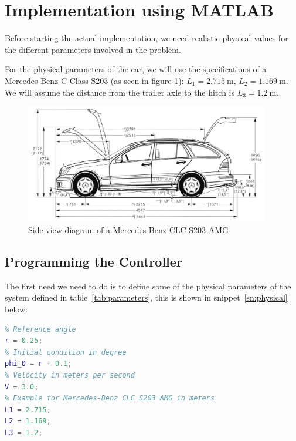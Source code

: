 \section{Implementation using MATLAB}
Before starting the actual implementation, we need realistic physical values for the different parameters involved in the problem.

For the physical parameters of the car, we will use the specifications of a Mercedes-Benz C-Class S203 (as seen in figure \ref{fig:car-sideview}): $L_{1} = \SI{2.715}{\m}$, $L_{2} = \SI{1.169}{\m}$. We will assume the distance from the trailer axle to the hitch is $L_{3} = \SI{1.2}{\m}$.

\begin{figure}[H]
	\centering
	\includegraphics[width=0.95\textwidth]{images/S203_Seitenansicht}
	\caption{Side view diagram of a Mercedes-Benz CLC S203 AMG}
	\label{fig:car-sideview}
\end{figure}

\subsection{Programming the Controller}
The first need we need to do is to define some of the physical parameters of the system defined in table~\ref{tab:parameters}, this is shown in snippet~\ref{sn:physical} below:
\begin{lstlisting}[language=matlab, label=sn:physical, caption=Physical parameters for the model]
%% Parameters
% Reference angle
r = 0.25;
% Initial condition in degree
phi_0 = r + 0.1;
% Velocity in meters per second
V = 3.0;
% Example for Mercedes-Benz CLC S203 AMG in meters
L1 = 2.715;
L2 = 1.169;
L3 = 1.2;
\end{lstlisting}

